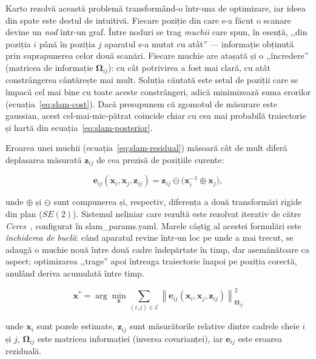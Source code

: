 \documentclass[a4paper,12pt,twoside,openany]{report}
\renewcommand{\texttt}[1]{\textnormal{#1}}
\begin{document}
Karto rezolvă această problemă transformând-o într-una de optimizare, iar
ideea din spate este destul de intuitivă. Fiecare poziție din care s-a făcut o
scanare devine un \textit{nod} într-un graf. Între noduri se trag \textit{muchii}
care spun, în esență, ,,din poziția $i$ până în poziția $j$ aparatul s-a mutat
cu atât'' — informație obținută prin suprapunerea celor două scanări. Fiecare
muchie are atașată și o ,,încredere'' (matricea de informație
$\boldsymbol{\Omega}_{ij}$): cu cât potrivirea a fost mai clară, cu atât
constrângerea cântărește mai mult. Soluția căutată este setul de poziții care
se împacă cel mai bine cu toate aceste constrângeri, adică minimizează suma
erorilor (ecuația~\eqref{eq:slam-cost}). Dacă presupunem că zgomotul de
măsurare este gaussian, acest cel-mai-mic-pătrat coincide chiar cu cea mai
probabilă traiectorie și hartă din ecuația~\eqref{eq:slam-posterior}.

Eroarea unei muchii (ecuația~\eqref{eq:slam-residual}) măsoară cât de mult
diferă deplasarea măsurată $\mathbf{z}_{ij}$ de cea prezisă de pozițiile
curente:

\begin{equation}\label{eq:slam-residual}
    \mathbf{e}_{ij}(\mathbf{x}_i, \mathbf{x}_j, \mathbf{z}_{ij})
        = \mathbf{z}_{ij} \ominus \big(\mathbf{x}_i^{-1} \oplus \mathbf{x}_j\big),
\end{equation}

\noindent unde $\oplus$ și $\ominus$ sunt compunerea și, respectiv, diferența
a două transformări rigide din plan ($SE(2)$). Sistemul neliniar care rezultă
este rezolvat iterativ de către \textit{Ceres}~\cite{ceres_solver}, configurat
în \texttt{slam\_params.yaml}. Marele câștig al acestei formulări este
\textit{închiderea de buclă}: când aparatul revine într-un loc pe unde a mai
trecut, se adaugă o muchie nouă între două cadre îndepărtate în timp, dar
asemănătoare ca aspect; optimizarea ,,trage'' apoi întreaga traiectorie înapoi
pe poziția corectă, anulând deriva acumulată între timp.

\begin{equation}\label{eq:slam-cost}
    \mathbf{x}^{*} = \arg\min_{\mathbf{x}}
        \sum_{(i,j) \in \mathcal{E}}
            \left\| \mathbf{e}_{ij}(\mathbf{x}_i, \mathbf{x}_j, \mathbf{z}_{ij}) \right\|^{2}_{\boldsymbol{\Omega}_{ij}}
\end{equation}

\noindent unde $\mathbf{x}_i$ sunt pozele estimate, $\mathbf{z}_{ij}$
sunt măsurătorile relative dintre cadrele cheie $i$ și $j$,
$\boldsymbol{\Omega}_{ij}$ este matricea informației (inversa
covarianței), iar $\mathbf{e}_{ij}$ este eroarea reziduală.
\end{document}
